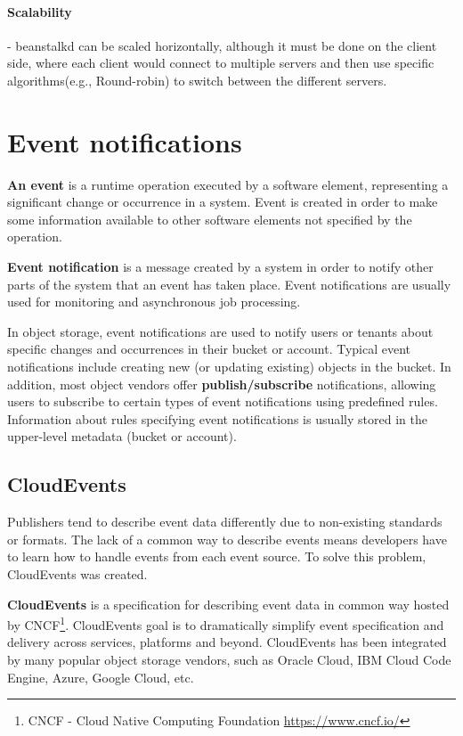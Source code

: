     \paragraph{Scalability}- beanstalkd can be scaled horizontally, although it must be done on the client side, where each client would connect to multiple servers and then use specific algorithms(e.g., Round-robin) to switch between the different servers.

\section{Event notifications}
     \textbf{An event} is a runtime operation executed by a software element, representing a significant change or occurrence in a system. Event is created in order to make some information available to other software elements not specified by the operation\cite{eventArchitecturalPatterns}.

    \textbf{Event notification} is a message created by a system in order to notify other parts of the system that an event has taken place\cite{eventRedHatEventDrivenArch}. Event notifications are usually used for monitoring and asynchronous job processing.

    In object storage, event notifications are used to notify users or tenants about specific changes and occurrences in their bucket or account. Typical event notifications include creating new (or updating existing) objects in the bucket. In addition, most object vendors offer \textbf{publish/subscribe} notifications, allowing users to subscribe to certain types of event notifications using predefined rules. Information about rules specifying event notifications is usually stored in the upper-level metadata (bucket or account).

    \subsection{CloudEvents}
    Publishers tend to describe event data differently due to non-existing standards or formats. The lack of a common way to describe events means developers have to learn how to handle events from each event source. To solve this problem, CloudEvents was created.

    \textbf{CloudEvents} is a specification for describing event data in common way\cite{eventCloudEvents} hosted by CNCF\footnote{CNCF - Cloud Native Computing Foundation {\url{https://www.cncf.io/}}}. CloudEvents goal is to dramatically simplify event specification and delivery across services, platforms and beyond.
    CloudEvents has been integrated by many popular object storage vendors, such as Oracle Cloud, IBM Cloud Code Engine, Azure, Google Cloud, etc.


